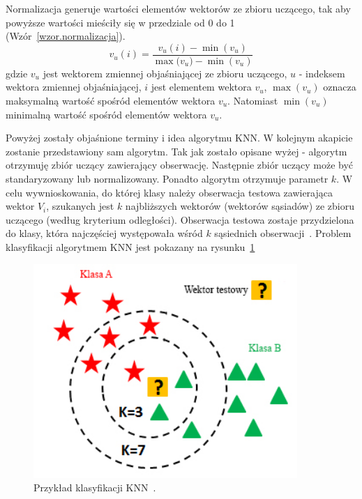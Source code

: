 \documentclass[a4paper,twoside,12pt]{book}
\begin{document}
    Normalizacja generuje wartości elementów wektorów ze zbioru uczącego, tak aby powyższe wartości mieściły się w przedziale
    od 0 do 1 (Wzór~\ref{wzor.normalizacja}).
    \large
    \begin{equation}
    {v}
        _{u}(i) = \frac{{v}_{u}(i)-\min({{v}_{u}})}{\max({{v}_{u})}-\min({{v}_{u}})}
        \label{wzor.normalizacja}
    \end{equation}
    \normalsize
    gdzie ${v}_{u}$ jest wektorem zmiennej objaśniającej ze zbioru uczącego, $u$ - indeksem wektora zmiennej
    objaśniającej, $i$ jest elementem wektora ${v}_{u}$, $\max({v}_{u})$ oznacza maksymalną wartość spośród elementów
    wektora ${v}_{u}$. Natomiast $\min({v}_{u})$ minimalną wartość spośród elementów
    wektora ${v}_{u}$.

    Powyżej zostały objaśnione terminy i idea algorytmu KNN. W kolejnym akapicie zostanie przedstawiony sam algorytm.
    Tak jak zostało opisane wyżej - algorytm otrzymuję zbiór uczący zawierający obserwację. Następnie zbiór uczący
    może być standaryzowany lub normalizowany. Ponadto algorytm otrzymuje parametr $k$.
    W celu wywnioskowania, do której klasy należy obserwacja testowa zawierająca wektor $V_{i}$, szukanych jest $k$
    najbliższych wektorów (wektorów sąsiadów) ze zbioru uczącego (według kryterium odległości). Obserwacja testowa
    zostaje przydzielona do klasy, która najczęściej występowała wśród $k$ sąsiednich obserwacji~\cite{knnOpis}.
    Problem klasyfikacji algorytmem KNN jest pokazany na rysunku~\ref{fig.klasyfikacjaKNN}
    \begin{figure}
        \centering
        \includegraphics[width=10cm]{Obrazy/klasyfikacjaKNN.jpg}
        \caption{Przykład klasyfikacji KNN~\cite{KNNObraz}.}
        \label{fig.klasyfikacjaKNN}
    \end{figure}
\end{document}
